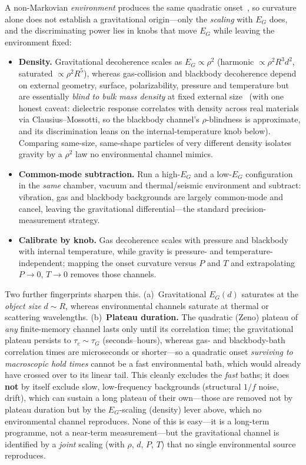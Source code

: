 \documentclass[aps,prd,onecolumn,amsmath,amssymb,nofootinbib,superscriptaddress]{revtex4-2}
\begin{document}
A non-Markovian \emph{environment} produces the same quadratic onset~\cite{R21,R22}, so curvature alone
does not establish a gravitational origin---only the \emph{scaling} with $E_G$ does, and the
discriminating power lies in knobs that move $E_G$ while leaving the environment fixed:
\begin{itemize}
\item \textbf{Density.} Gravitational decoherence scales as $E_G\propto\rho^2$ (harmonic
$\propto\rho^2 R^3 d^2$, saturated $\propto\rho^2 R^5$), whereas gas-collision and blackbody
decoherence depend on external geometry, surface, polarizability, pressure and temperature but are
essentially \emph{blind to bulk mass density} at fixed external size~\cite{R16} (with one honest
caveat: dielectric response correlates with density across real materials via Clausius--Mossotti, so
the blackbody channel's $\rho$-blindness is approximate, and its discrimination leans on the
internal-temperature knob below). Comparing same-size,
same-shape particles of very different density isolates gravity by a $\rho^2$ law no environmental
channel mimics.
\item \textbf{Common-mode subtraction.} Run a high-$E_G$ and a low-$E_G$ configuration in the
\emph{same} chamber, vacuum and thermal/seismic environment and subtract: vibration, gas and blackbody
backgrounds are largely common-mode and cancel, leaving the gravitational differential---the standard
precision-measurement strategy.
\item \textbf{Calibrate by knob.} Gas decoherence scales with pressure and blackbody with internal
temperature, while gravity is pressure- and temperature-independent; mapping the onset curvature
versus $P$ and $T$ and extrapolating $P\to0$, $T\to0$ removes those channels.
\end{itemize}
Two further fingerprints sharpen this. (a)~Gravitational $E_G(d)$ saturates at the \emph{object size}
$d\sim R$, whereas environmental channels saturate at thermal or scattering wavelengths.
(b)~\textbf{Plateau duration.} The quadratic (Zeno) plateau of \emph{any} finite-memory channel lasts
only until its correlation time; the gravitational plateau persists to $\tau_c\sim\tau_G$
(seconds--hours), whereas gas- and blackbody-bath correlation times are microseconds or shorter---so a
quadratic onset \emph{surviving to macroscopic hold times} cannot be a fast environmental bath, which
would already have crossed over to its linear tail. This cleanly excludes the \emph{fast} baths; it
does \textbf{not} by itself exclude slow, low-frequency backgrounds (structural $1/f$ noise, drift),
which can sustain a long plateau of their own---those are removed not by plateau duration but by the
$E_G$-scaling (density) lever above, which no environmental channel reproduces. None of this is easy---it is a long-term programme, not a near-term
measurement---but the gravitational channel is identified by a \emph{joint} scaling (with $\rho$, $d$,
$P$, $T$) that no single environmental source reproduces.
\end{document}
